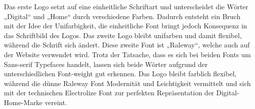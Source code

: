 Das erste Logo setzt auf eine einheitliche Schriftart und unterscheidet die Wörter „Digital“ und „Home“ durch verschiedene Farben. Dadurch entsteht ein Bruch mit der Idee der Unifarbigkeit, die einheitliche Font bringt jedoch Konsequenz in das Schriftbild des Logos.
Das zweite Logo bleibt unifarben und damit flexibel, während die Schrift sich ändert. Diese zweite Font ist „Raleway“, welche auch auf der Website verwendet wird. Trotz der Tatsache, dass es sich bei beiden Fonts um Sans-serif Typefaces handelt, lassen sich beide Wörter aufgrund der unterschiedlichen Font-weight gut erkennen. Das Logo bleibt farblich flexibel, während die dünne Raleway Font Modernität und Leichtigkeit vermittelt und sich mit der technischen Electrolize Font zur perfekten Repräsentation der Digital-Home-Marke vereint.
